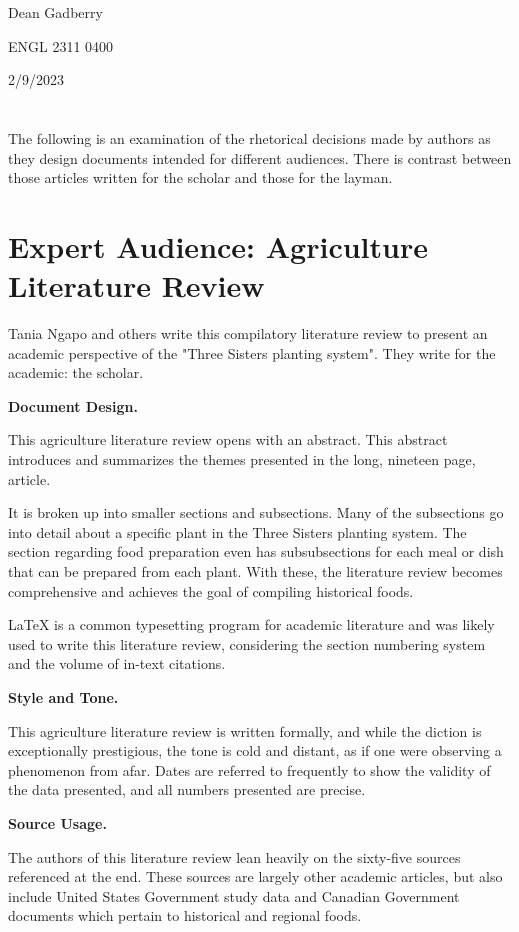 \documentclass[12pt,a4paper,english]{article}
\begin{document}
\begin{flushleft}

Dean Gadberry
\par
ENGL 2311 0400
\par
2/9/2023

\section*{}
The following is an examination of the rhetorical decisions made by authors as they design documents intended for different audiences. There is contrast between those articles written for the scholar and those for the layman.
\par 

\section*{Expert Audience: Agriculture Literature Review}
Tania Ngapo and others write this compilatory literature review to present an academic perspective of the "Three Sisters planting system". They write for the academic: the scholar.
\par

\textbf{Document Design.} %
\par
This agriculture literature review opens with an abstract. This abstract introduces and summarizes the themes presented in the long, nineteen page, article. 
\par
It is broken up into smaller sections and subsections. Many of the subsections go into detail about a specific plant in the Three Sisters planting system. The section regarding food preparation even has subsubsections for each meal or dish that can be prepared from each plant. With these, the literature review becomes comprehensive and achieves the goal of compiling historical foods.
\par
\textrm{\LaTeX} is a common typesetting program for academic literature and was likely used to write this literature review, considering the section numbering system and the volume of in-text citations.
\par
\textbf{Style and Tone.} %
\par
This agriculture literature review is written formally, and while the diction is exceptionally prestigious, the tone is cold and distant, as if one were observing a phenomenon from afar. Dates are referred to frequently to show the validity of the data presented, and all numbers presented are precise.
\par
\textbf{Source Usage.} %
\par
The authors of this literature review lean heavily on the sixty-five sources referenced at the end. These sources are largely other academic articles, but also include United States Government study data and Canadian Government documents which pertain to historical and regional foods.


\end{flushleft}
\end{document}

